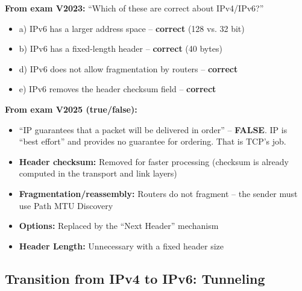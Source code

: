 \begin{imagebox}
\end{imagebox}

\begin{exambox}
\textbf{From exam V2023:} ``Which of these are correct about IPv4/IPv6?''
\begin{itemize}[noitemsep]
    \item a) IPv6 has a larger address space -- \textbf{correct} (128 vs. 32 bit)
    \item b) IPv6 has a fixed-length header -- \textbf{correct} (40 bytes)
    \item d) IPv6 does not allow fragmentation by routers -- \textbf{correct}
    \item e) IPv6 removes the header checksum field -- \textbf{correct}
\end{itemize}

\textbf{From exam V2025 (true/false):}
\begin{itemize}[noitemsep]
    \item ``IP guarantees that a packet will be delivered in order'' -- \textbf{FALSE}. IP is ``best effort'' and provides no guarantee for ordering. That is TCP's job.
\end{itemize}
\end{exambox}

\begin{keybox}
\begin{itemize}[noitemsep]
    \item \textbf{Header checksum:} Removed for faster processing (checksum is already computed in the transport and link layers)
    \item \textbf{Fragmentation/reassembly:} Routers do not fragment -- the sender must use Path MTU Discovery
    \item \textbf{Options:} Replaced by the ``Next Header'' mechanism
    \item \textbf{Header Length:} Unnecessary with a fixed header size
\end{itemize}
\end{keybox}

\subsection{Transition from IPv4 to IPv6: Tunneling}

